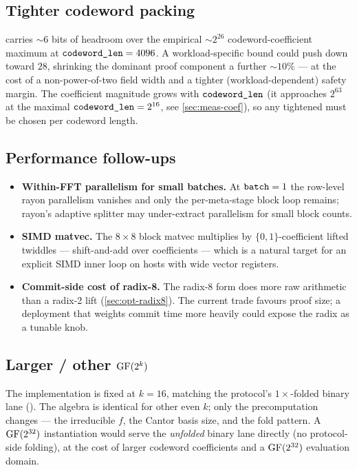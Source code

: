 \subsection{Tighter codeword packing}

 carries $\sim 6$ bits of headroom over the
empirical $\sim 2^{26}$ codeword-coefficient maximum at
$\texttt{codeword\_len} = 4096$. A workload-specific bound could push
 down toward $28$, shrinking the dominant proof
component a further $\sim 10\%$ --- at the cost of a non-power-of-two
field width and a tighter (workload-dependent) safety margin. The
coefficient magnitude grows with $\texttt{codeword\_len}$ (it approaches
$2^{63}$ at the maximal $\texttt{codeword\_len} = 2^{16}$, see
\autoref{sec:meas-coef}), so any tightened  must be
chosen per codeword length.

\subsection{Performance follow-ups}

\begin{itemize}
  \item \textbf{Within-FFT parallelism for small batches.} At
    $\texttt{batch} = 1$ the row-level rayon parallelism vanishes and
    only the per-meta-stage block loop remains; rayon's adaptive
    splitter may under-extract parallelism for small block counts.
  \item \textbf{SIMD matvec.} The $8 \times 8$ block matvec multiplies
    by $\{0,1\}$-coefficient lifted twiddles --- shift-and-add over
     coefficients --- which is a natural target for an
    explicit SIMD inner loop on hosts with wide vector registers.
  \item \textbf{Commit-side cost of radix-8.} The radix-8 form does
    more raw arithmetic than a radix-2 lift (\autoref{sec:opt-radix8}).
    The current trade favours proof size; a deployment that weights
    commit time more heavily could expose the radix as a tunable knob.
\end{itemize}

\subsection{Larger / other $\operatorname{GF}(2^k)$}

The implementation is fixed at $k = 16$, matching the protocol's
$1\times$-folded binary lane (). The algebra is
identical for other even $k$; only the precomputation changes ---
the irreducible $f$, the Cantor basis size, and the
 fold pattern. A $\operatorname{GF}(2^{32})$ instantiation
would serve the \emph{unfolded} binary lane directly (no protocol-side
folding), at the cost of larger codeword coefficients and a
$\operatorname{GF}(2^{32})$ evaluation domain.

